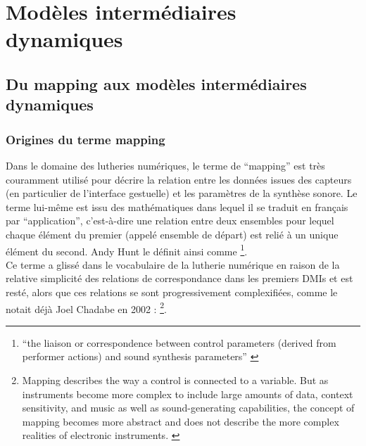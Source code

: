\section{Modèles intermédiaires dynamiques}
\label{sec:algorithms:MID}

\subsection{Du mapping aux modèles intermédiaires dynamiques}
\label{sec:algorithms:MID:mapping-to-MID}

\subsubsection{Origines du terme mapping} 

\noindent Dans le domaine des lutheries numériques, le terme de ``mapping'' est très couramment utilisé pour décrire la relation entre les données issues des capteurs (en particulier de l'interface gestuelle) et les paramètres de la synthèse sonore. Le terme lui-même est issu des mathématiques dans lequel il se traduit en français par ``application'', c'est-à-dire une relation entre deux ensembles pour lequel chaque élément du premier (appelé ensemble de départ) est relié à un unique élément du second. Andy Hunt le définit ainsi comme \footnote{``the liaison or correspondence between control parameters (derived from performer actions) and sound synthesis parameters'' \cite{hunt_towards_2000}}.\\
\indent Ce terme a glissé dans le vocabulaire de la lutherie numérique en raison de la relative simplicité des relations de correspondance dans les premiers \glspl{DMI} et est resté, alors que ces relations se sont progressivement complexifiées, comme le notait déjà Joel Chadabe en 2002 : \footnote{Mapping describes the way a control is connected to a variable. But as instruments become more complex to include large amounts of data, context sensitivity, and music as well as sound-generating capabilities, the concept of mapping becomes more abstract and does not describe the more complex realities of electronic instruments. \cite{chadabe_limitations_2002}}.

